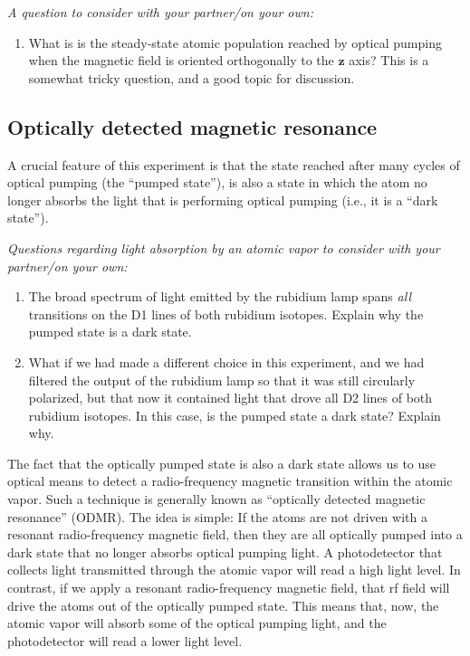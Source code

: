 \documentclass{../lab}
\begin{document}
\emph{A question to consider with your partner/on your own:}
\begin{enumerate}[resume=forstudents,label=Q\arabic*.]%
\item{} What is is the steady-state atomic population reached by optical pumping when the magnetic field is oriented orthogonally to the $\mathbf{z}$ axis?  This is a somewhat tricky question, and a good topic for discussion.
\end{enumerate}


\subsection{Optically detected magnetic resonance}

A crucial feature of this experiment is that the state reached after many cycles of optical pumping (the ``pumped state''), is also a state in which the atom no longer absorbs the light that is performing optical pumping (i.e., it is a ``dark state'').  

\emph{Questions regarding light absorption by an atomic vapor to consider with your partner/on your own:}
\begin{enumerate}[resume=forstudents, label=Q\arabic*.]%
\item{} The broad spectrum of light emitted by the rubidium lamp spans \emph{all} transitions on the D1 lines of both rubidium isotopes.  Explain why the pumped state is a dark state.
\item{} What if we had made a different choice in this experiment, and we had filtered the output of the rubidium lamp so that it was still circularly polarized, but that now it contained light that drove all D2 lines of both rubidium isotopes.  In this case, is the pumped state a dark state?  Explain why.
\end{enumerate}

The fact that the optically pumped state is also a dark state allows us to use optical means to detect a radio-frequency magnetic transition within the atomic vapor.  Such a technique is generally known as ``optically detected magnetic resonance'' (ODMR).  The idea is simple:  If the atoms are not driven with a resonant radio-frequency magnetic field, then they are all optically pumped into a dark state that no longer absorbs optical pumping light.  A photodetector that collects light transmitted through the atomic vapor will read a high light level.  In contrast, if we apply a resonant radio-frequency magnetic field, that rf field will drive the atoms out of the optically pumped state.  This means that, now, the atomic vapor will absorb some of the optical pumping light, and the photodetector will read a lower light level.
\end{document}

